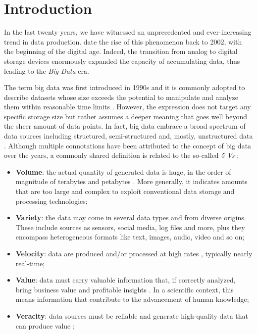 \chapter{Introduction}


In the last twenty years, we have witnessed an unprecedented and ever-increasing trend in data production. 
 date the rise of this phenomenon back to 2002, with the beginning of the digital age.
Indeed, the transition from analog to digital storage devices enormously expanded the capacity of accumulating data, thus leading to the \emph{Big Data} era.

The term big data was first introduced in 1990s \cite{16, 17} and it is commonly adopted to describe datasets whose size exceeds the potential to manipulate and analyze them within reasonable time limits \cite{snijders2012big}.
However, the expression does not target any specific storage size but rather assumes a deeper meaning that goes well beyond the sheer amount of data points.
In fact, big data embrace a broad spectrum of data sources including structured, semi-structured and, mostly, unstructured data \cite{dedic2016towards}.
Although multiple connotations have been attributed to the concept of big data over the years, a commonly shared definition is related to the so-called \emph{5 Vs} \cite{3}:

\begin{itemize}
    \item \textbf{Volume}: the actual quantity of generated data is huge, in the order of magnitude of terabytes and petabytes \cite{sagiroglu2013big}. More generally, it indicates amounts that are too large and complex to exploit conventional data storage and processing technologies;
    
    \item \textbf{Variety}: the data may come in several data types and from diverse origins. These include sources as sensors, social media, log files and more, plus they encompass heterogeneous formats like text, images, audio, video and so on; 
    
    \item \textbf{Velocity}: data are produced and/or processed at high rates \cite{kitchin2016makes}, typically nearly real-time;
    
    \item \textbf{Value}: data must carry valuable information that, if correctly analyzed, bring business value and profitable insights \cite{uddin2014seven}. In a scientific context, this means information that contribute to the advancement of human knowledge;
    
    \item \textbf{Veracity}: data sources must be reliable and generate high-quality data that can produce value \cite{onay2018review, 33};


\end{itemize}


